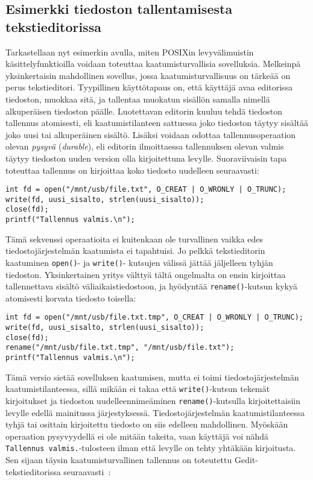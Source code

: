 \subsection{Esimerkki tiedoston tallentamisesta tekstieditorissa}
Tarkastellaan nyt esimerkin avulla,
miten POSIXin levyvälimuistin käsittelyfunktioilla voidaan toteuttaa kaatumisturvallisia sovelluksia.
Melkeinpä yksinkertaisin mahdollinen sovellus,
jossa kaatumisturvallisuus on tärkeää on perus tekstieditori.
Tyypillinen käyttötapaus on, että käyttäjä avaa editorissa tiedoston, muokkaa sitä, ja tallentaa muokatun sisällön samalla nimellä alkuperäisen tiedoston päälle.
Luotettavan editorin kuuluu tehdä tiedoston tallennus atomisesti,
eli kaatumistilanteen sattuessa joko tiedoston täytyy sisältää joko uusi tai alkuperäinen sisältö.
Lisäksi voidaan odottaa tallennusoperaation olevan \emph{pysyvä} (\emph{durable}),
eli editorin ilmoittaessa tallennuksen olevan valmis täytyy tiedoston uuden version olla kirjoitettuna levylle.
Suoraviivaisin tapa toteuttaa tallennus on kirjoittaa koko tiedosto uudelleen seuraavasti:

\begin{samepage}
\begin{verbatim}
int fd = open("/mnt/usb/file.txt", O_CREAT | O_WRONLY | O_TRUNC);
write(fd, uusi_sisalto, strlen(uusi_sisalto));
close(fd);
printf("Tallennus valmis.\n");
\end{verbatim}
\end{samepage}
%
Tämä sekvenssi operaatioita ei kuitenkaan ole turvallinen vaikka edes tiedostojärjestelmän kaatumista ei tapahtuisi.
Jo pelkkä tekstieditorin kaatuminen \texttt{open()}- ja \texttt{write()}- kutsujen välissä jättää jäljelleen tyhjän tiedoston.
Yksinkertainen yritys välttyä tältä ongelmalta on ensin kirjoittaa tallennettava sisältö väliaikaistiedostoon,
ja hyödyntää \texttt{rename()}-kutsun kykyä atomisesti korvata tiedosto toisella:

\begin{samepage}
\begin{verbatim}
int fd = open("/mnt/usb/file.txt.tmp", O_CREAT | O_WRONLY | O_TRUNC);
write(fd, uusi_sisalto, strlen(uusi_sisalto));
close(fd);
rename("/mnt/usb/file.txt.tmp", "/mnt/usb/file.txt");
printf("Tallennus valmis.\n");
\end{verbatim}
\end{samepage}
%
Tämä versio sietää sovelluksen kaatumisen,
mutta ei toimi tiedostojärjestelmän kaatumistilanteessa,
sillä mikään ei takaa että \texttt{write()}-kutsun tekemät kirjoitukset ja tiedoston uudelleennimeäminen \texttt{rename()}-kutsulla kirjoitettaisiin levylle edellä mainitussa järjestyksessä.
Tiedostojärjestelmän kaatumistilanteessa tyhjä tai osittain kirjoitettu tiedosto on siis edelleen mahdollinen.
Myöskään operaation pysyvyydellä ei ole mitään takeita,
vaan käyttäjä voi nähdä \texttt{Tallennus valmis.}-tulosteen ilman että levylle on tehty yhtäkään kirjoitusta.
Sen sijaan täysin kaatumisturvallinen tallennus on toteutettu Gedit-tekstieditorissa seuraavasti~\cite{OptimisticCrashConsistency}:

